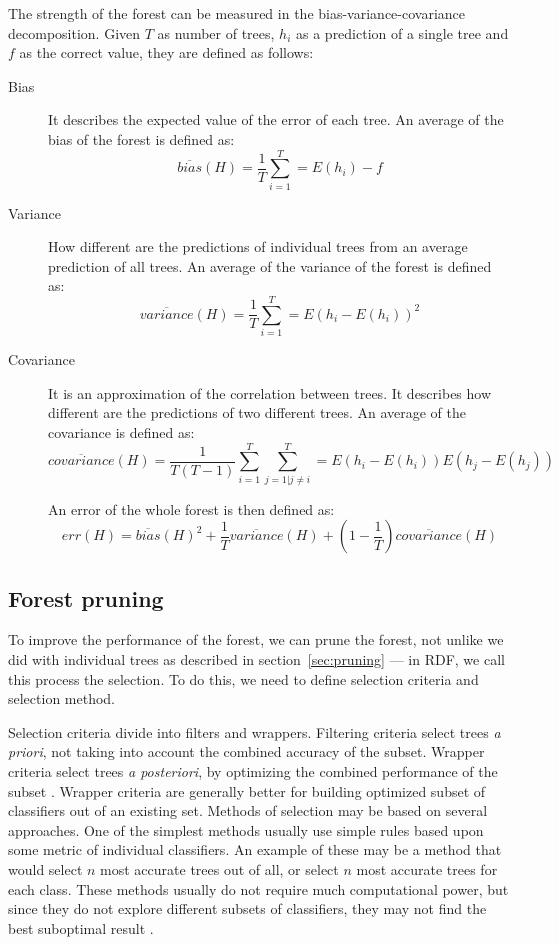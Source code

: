 \documentclass[thesis=B,english]{FITthesis}[2012/10/20]
\begin{document}
	The strength of the forest can be measured in the bias-variance-covariance decomposition. Given \(T\) as number of trees, \(h_i\) as a prediction of a single tree and \(f\) as the correct value, they are defined as follows:
	\begin{description}
	\item[Bias] It describes the expected value of the error of each tree. An average of the bias of the forest is defined as:
	\[
	\overline{\textit{bias}}(H) = \frac{1}{T}\sum_{i=1}^T=E(h_i)-f
	\]
	\item[Variance] How different are the predictions of individual trees from an average prediction of all trees. An average of the variance of the forest is defined as:
	\[
	\overline{\textit{variance}}(H) = \frac{1}{T}\sum_{i=1}^T=E(h_i-E(h_i))^2
	\]
	\item[Covariance] It is an approximation of the correlation between trees. It describes how different are the predictions of two different trees. An average of the covariance is defined as:
	\[
	\overline{\textit{covariance}}(H) = \frac{1}{T(T-1)}\sum_{i=1}^T\sum_{j=1|j \neq i}^T=E(h_i-E(h_i))E(h_j-E(h_j))
	\]
 	
	An error of the whole forest is then defined as: 
	\[
	\textit{err}(H)=\overline{\textit{bias}}(H)^2 + \frac{1}{T}\overline{\textit{variance}}(H) + \left(1 - \frac{1}{T}\right)\overline{\textit{covariance}}(H)
	\]

	\end{description}

	\subsection{Forest pruning}
	To improve the performance of the forest, we can prune the forest, not unlike we did with individual trees as described in section~\ref{sec:pruning} --- in RDF, we call this process the selection. To do this, we need to define selection criteria and selection method.

	Selection criteria divide into filters and wrappers. Filtering criteria select trees \textit{a priori}, not taking into account the combined accuracy of the subset. Wrapper criteria select trees \textit{a posteriori}, by optimizing the combined performance of the subset \cite{PRUNING_RDF}. Wrapper criteria are generally better for building optimized subset of classifiers out of an existing set. Methods of selection may be based on several approaches.
	One of the simplest methods usually use simple rules based upon some metric of individual classifiers. An example of these may be a method that would select \(n\) most accurate trees out of all, or select \(n\) most accurate trees for each class. These methods usually do not require much computational power, but since they do not explore different subsets of classifiers, they may not find the best suboptimal result \cite{PRUNING_RDF}. 
	
\end{document}
